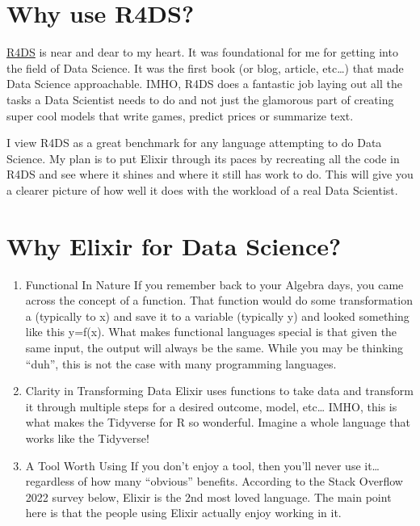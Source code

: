 \documentclass[
  letterpaper,
  DIV=11,
  numbers=noendperiod]{scrreprt}
\begin{document}
\hypertarget{why-use-r4ds}{%
\section*{Why use R4DS?}\label{why-use-r4ds}}

\href{https://r4ds.had.co.nz}{R4DS} is near and dear to my heart. It was
foundational for me for getting into the field of Data Science. It was
the first book (or blog, article, etc\ldots) that made Data Science
approachable. IMHO, R4DS does a fantastic job laying out all the tasks a
Data Scientist needs to do and not just the glamorous part of creating
super cool models that write games, predict prices or summarize text.

I view R4DS as a great benchmark for any language attempting to do Data
Science. My plan is to put Elixir through its paces by recreating all
the code in R4DS and see where it shines and where it still has work to
do. This will give you a clearer picture of how well it does with the
workload of a real Data Scientist.

\hypertarget{why-elixir-for-data-science}{%
\section*{Why Elixir for Data
Science?}\label{why-elixir-for-data-science}}

\begin{enumerate}
\def\labelenumi{\arabic{enumi}.}
\item
  Functional In Nature If you remember back to your Algebra days, you
  came across the concept of a function. That function would do some
  transformation a (typically to x) and save it to a variable (typically
  y) and looked something like this y=f(x). What makes functional
  languages special is that given the same input, the output will always
  be the same. While you may be thinking ``duh'', this is not the case
  with many programming languages.
\item
  Clarity in Transforming Data Elixir uses functions to take data and
  transform it through multiple steps for a desired outcome, model,
  etc\ldots{} IMHO, this is what makes the Tidyverse for R so wonderful.
  Imagine a whole language that works like the Tidyverse!
\item
  A Tool Worth Using If you don't enjoy a tool, then you'll never use
  it\ldots regardless of how many ``obvious'' benefits. According to the
  Stack Overflow 2022 survey below, Elixir is the 2nd most loved
  language. The main point here is that the people using Elixir actually
  enjoy working in it.
\end{enumerate}
\end{document}
